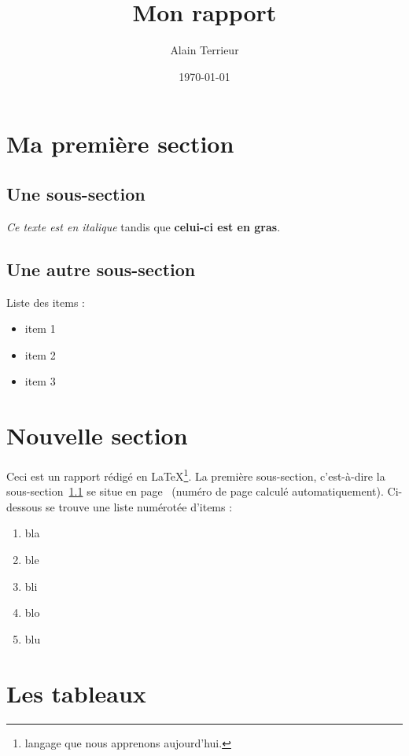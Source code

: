 \documentclass[12pt]{article}
\title{Mon rapport}
\author{Alain Terrieur}
\date{\today}%
\begin{document}
\maketitle
\thispagestyle{empty}
\setcounter{page}{0}

\newpage
\tableofcontents
\newpage

\section{Ma première section}

\subsection{Une sous-section}
\label{coucou}

\textit{Ce texte est en italique} tandis que \textbf{celui-ci est en gras}.

\subsection{Une autre sous-section}

Liste des items :

\begin{itemize}
	\item item 1
	\item item 2
	\item item 3
\end{itemize}

\section{Nouvelle section}

Ceci est un rapport rédigé en LaTeX\footnote{langage que nous apprenons aujourd'hui.}. La première sous-section, c'est-à-dire la sous-section~\ref{coucou} se situe en page~\pageref{coucou} (numéro de page calculé automatiquement). Ci-dessous se trouve une liste numérotée d'items :

\begin{enumerate}
	\item bla
	\item ble
	\item bli
	\item blo
	\item blu
\end{enumerate}

\section{Les tableaux}
\end{document}

